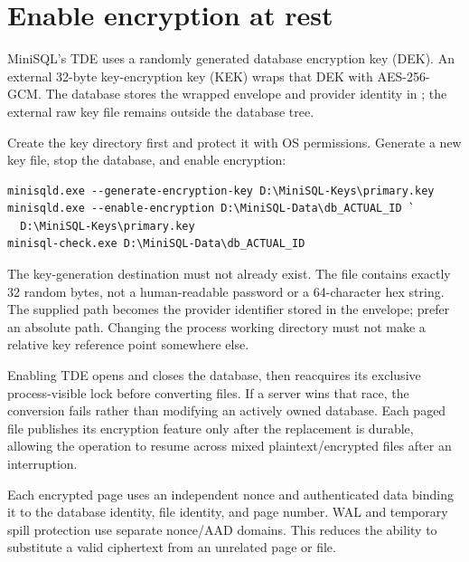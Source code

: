 \section{Enable encryption at rest}

MiniSQL's TDE uses a randomly generated database encryption key (DEK).
An external 32-byte key-encryption key (KEK) wraps that DEK with AES-256-GCM.
The database stores the wrapped envelope and provider identity in
; the external raw key file remains outside the
database tree.

Create the key directory first and protect it with OS permissions. Generate a
new key file, stop the database, and enable encryption:

\begin{lstlisting}
minisqld.exe --generate-encryption-key D:\MiniSQL-Keys\primary.key
minisqld.exe --enable-encryption D:\MiniSQL-Data\db_ACTUAL_ID `
  D:\MiniSQL-Keys\primary.key
minisql-check.exe D:\MiniSQL-Data\db_ACTUAL_ID
\end{lstlisting}

The key-generation destination must not already exist. The file contains
exactly 32 random bytes, not a human-readable password or a 64-character hex
string. The supplied path becomes the provider identifier stored in the
envelope; prefer an absolute path. Changing the process working directory
must not make a relative key reference point somewhere else.

Enabling TDE opens and closes the database, then reacquires its exclusive
process-visible lock before converting files. If a server wins that race,
the conversion fails rather than modifying an actively owned database. Each
paged file publishes its encryption feature only after the replacement is
durable, allowing the operation to resume across mixed plaintext/encrypted
files after an interruption.

Each encrypted page uses an independent nonce and authenticated data binding
it to the database identity, file identity, and page number. WAL and temporary
spill protection use separate nonce/AAD domains. This reduces the ability to
substitute a valid ciphertext from an unrelated page or file.


